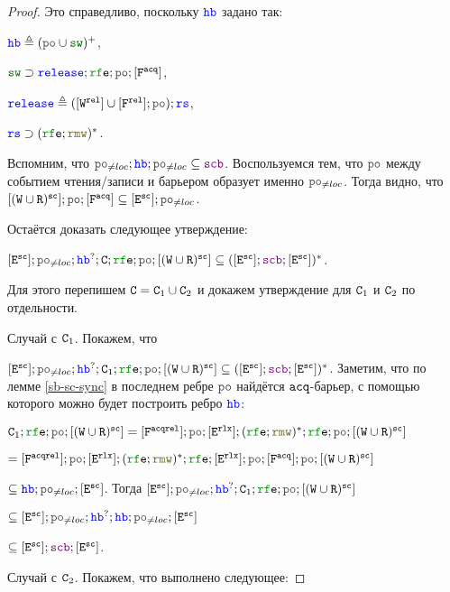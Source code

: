 \documentclass[14pt]{matmex-diploma-custom}
\newcommand{\Fa}{\lF^{\acq}}
\newcommand{\Far}{\lF^{\acqrel}}
\begin{document}
\begin{proof}
  
  \canceloffset Это справедливо, поскольку $\lHB$ задано так: 

  $\lHB \defeq (\lPO \cup \lSW)^{+}$,

  $\lSW \supset \mathtt{\color{blue}release};\lRFE;\lPO;[\lF^{\acq}]$,

  $\mathtt{\color{blue}release} \defeq ([\lW^{\rel}] \cup [\lF^{\rel}];\lPO);\mathtt{\color{blue}rs}$,

  $\mathtt{\color{blue}rs} \supset (\lRFE;\lRMW)^{*}$.

  Вспомним, что $\lPO_{\neq loc} ; \lHB ; \lPO_{\neq loc} \subseteq \lSCB$. Воспользуемся тем, что $\lPO$ между событием чтения/записи и барьером образует именно $\lPO_{\neq loc}$. Тогда видно, что $[(\lW \cup \lR)^{\sco}]; \lPO; [\lF^{\acq}] \subseteq [\lE^{\sco}]; \lPO_{\neq loc}$.

  Остаётся доказать следующее утверждение:

  $[\lE^{\sco}]; \lPO_{\neq loc} ; \lHB^?; \CA; \lRFE; \lPO ; [(\lW \cup \lR)^{\sco}] \subseteq  ([\lE^{\sco}] ; \lSCB ; [\lE^{\sco}])^{*}$.

  Для этого перепишем $\mathtt{C}=\mathtt{C}_1 \cup \mathtt{C}_2$ и докажем утверждение для $\mathtt{C}_1$ и $\mathtt{C}_2$ по отдельности. 

  
  Случай с $\mathtt{C}_1$. Покажем, что

  $[\lE^{\sco}]; \lPO_{\neq loc} ; \lHB^?; \CA_1; \lRFE; \lPO ; [(\lW \cup \lR)^{\sco}]\subseteq  ([\lE^{\sco}] ; \lSCB ; [\lE^{\sco}])^{*}$.
Заметим, что по лемме \ref{sb-sc-sync}   в последнем ребре $\lPO$ найдётся ${\mathtt{acq}}$-барьер, с помощью которого можно будет построить ребро $\lHB$:

    $\CA_1; \lRFE; \lPO ; [(\lW \cup \lR)^{\sco}] = [\Far] ; \lPO ; [\lE^{\rlx}] ; (\lRFE ; \lRMW)^{*}; \lRFE; \lPO ; [(\lW \cup \lR)^{\sco}]$

    $= [\Far] ; \lPO ; [\lE^{\rlx}] ; (\lRFE ; \lRMW)^{*}; \lRFE; [\lE^{\rlx}]; \lPO; [\Fa]; \lPO ; [(\lW \cup \lR)^{\sco}]$

    $\subseteq \lHB; \lPO_{\neq loc}; [\lE^{\sco}]$.  Тогда $[\lE^{\sco}]; \lPO_{\neq loc} ; \lHB^?; \CA_1; \lRFE; \lPO ; [(\lW \cup \lR)^{\sco}]$

    $\subseteq [\lE^{\sco}]; \lPO_{\neq loc} ; \lHB^?; \lHB; \lPO_{\neq loc}; [\lE^{\sco}]$

    $\subseteq [\lE^{\sco}] ; \lSCB ; [\lE^{\sco}]$.

    \vspace{1em}
    
    Случай с $\mathtt{C}_2$. Покажем, что выполнено следующее:


\end{proof}
\end{document}
